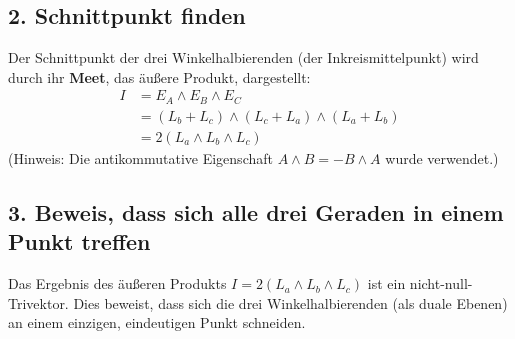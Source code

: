 \documentclass{article}
\begin{document}
\subsection*{2. Schnittpunkt finden}
Der Schnittpunkt der drei Winkelhalbierenden (der Inkreismittelpunkt) wird durch ihr \textbf{Meet}, das äußere Produkt, dargestellt:
\begin{align*}
I &= E_A \wedge E_B \wedge E_C \\
&= (L_b + L_c) \wedge (L_c + L_a) \wedge (L_a + L_b) \\
&= 2(L_a \wedge L_b \wedge L_c)
\end{align*}
(Hinweis: Die antikommutative Eigenschaft $A \wedge B = -B \wedge A$ wurde verwendet.)

\subsection*{3. Beweis, dass sich alle drei Geraden in einem Punkt treffen}
Das Ergebnis des äußeren Produkts $I = 2(L_a \wedge L_b \wedge L_c)$ ist ein nicht-null-Trivektor. Dies beweist, dass sich die drei Winkelhalbierenden (als duale Ebenen) an einem einzigen, eindeutigen Punkt schneiden.
\end{document}
